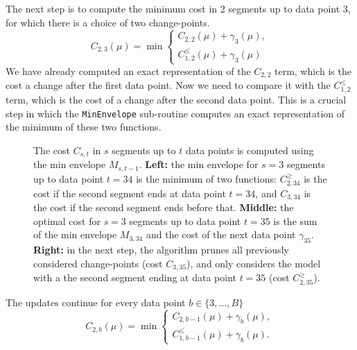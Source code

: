\documentclass{article}
\begin{document}
The next step is to compute the minimum cost in 2 segments up to data
point 3, for which there is a choice of two change-points.
\begin{equation*}
  C_{2,3}(\mu) = \min
  \begin{cases}
    C_{2,2}(\mu)+\gamma_3(\mu), \\
    C_{1,2}^{\leq}(\mu)+\gamma_3(\mu)
  \end{cases}
\end{equation*}
We have already computed an exact representation of the $C_{2,2}$
term, which is the cost a change after the first data point. Now we
need to compare it with the $C_{1,2}^{\leq}$ term, which is the cost
of a change after the second data point. This is a crucial step in
which the \texttt{MinEnvelope} sub-routine computes an exact
representation of the minimum of these two functions.

\begin{figure}[!t]
  \begin{center}
    
  \end{center}
  \caption{\label{fig:min-envelope} The cost $C_{s,t}$ in $s$ segments
    up to $t$ data points is computed using the min envelope
    $M_{s,t-1}$. \textbf{Left:} the min envelope for $s=3$ segments up
    to data point $t=34$ is the minimum of two functions:
    $C^{\geq}_{2,34}$ is the cost if the second segment ends at data
    point $t=34$, and $C_{3,34}$ is the cost if the second segment
    ends before that. \textbf{Middle:} the optimal cost for $s=3$
    segments up to data point $t=35$ is the sum of the min envelope
    $M_{3,34}$ and the cost of the next data point
    $\gamma_{35}$. \textbf{Right:} in the next step, the
    algorithm prunes all previously considered change-points (cost
    $C_{3,35}$), and only considers the model with a the second segment
    ending at data point $t=35$ (cost $C^{\geq}_{2,35}$).}
\end{figure}

The updates continue for every data point $b\in\{3, ..., B\}$
\begin{equation*}
  C_{2,b}(\mu) = \min
  \begin{cases}
    C_{2,b-1}(\mu) + \gamma_b(\mu),\\
    C_{1,b-1}^{\leq}(\mu) + \gamma_b(\mu).
  \end{cases}
\end{equation*}
\end{document}
